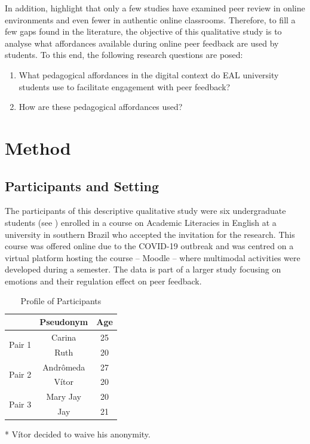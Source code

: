\documentclass[english]{textolivre}
\begin{document}
In addition, \textcite{payant2022learners} highlight that only a few studies have examined peer review in online environments and even fewer in authentic online classrooms. Therefore, to fill a few gaps found in the literature, the objective of this qualitative study is to analyse what affordances available during online peer feedback are used by students. To this end, the following research questions are posed:

\begin{enumerate}
    \item What pedagogical affordances in the digital context do EAL university students use to facilitate engagement with peer feedback?
    \item How are these pedagogical affordances used?
\end{enumerate}

\section{Method}

\subsection{Participants and Setting}

The participants of this descriptive qualitative study were six undergraduate students (see ) enrolled in a course on Academic Literacies in English at a university in southern Brazil who accepted the invitation for the research. This course was offered online due to the COVID-19 outbreak and was centred on a virtual platform hosting the course – Moodle – where multimodal activities were developed during a semester. The data is part of a larger study focusing on emotions and their regulation effect on peer feedback.


\begin{table}[h!]
\centering
\begin{threeparttable}
\caption{Profile of Participants}
\label{tab1}
\begin{tabular}{ccc}
\toprule
\multicolumn{1}{l}{}    & Pseudonym & Age \\
\midrule
\multirow{2}{*}{Pair 1} & Carina    & 25  \\
                        & Ruth      & 20  \\[1ex]
\multirow{2}{*}{Pair 2} & Andrômeda & 27  \\
                        & Vítor\tnote{*} & 20  \\[1ex]
\multirow{2}{*}{Pair 3} & Mary Jay  & 20  \\
                        & Jay       & 21 \\
\bottomrule
\end{tabular}
\begin{tablenotes}
    \item[*] Vítor decided to waive his anonymity.
\end{tablenotes}
\end{threeparttable}
\end{table}
\end{document}
